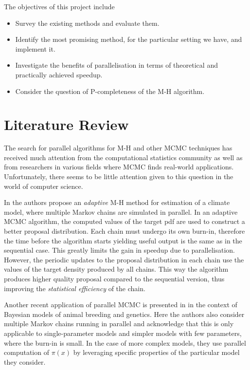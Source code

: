 \documentclass[11pt]{article}       %
\begin{document}
The objectives of this project include
\begin{itemize}
\item Survey the existing methods and evaluate them.
\item Identify the most promising method, for the particular setting we have, and implement it.
\item Investigate the benefits of parallelisation in terms of theoretical and
     practically achieved speedup.
\item Consider the question of P-completeness of the M-H algorithm.
\end{itemize}


\section{Literature Review} \label{litrev}

The search for parallel algorithms for M-H and other MCMC techniques has received
much attention from the computational statistics community as well as from 
researchers in various fields where MCMC finds real-world applications.  
Unfortunately, there seems to be little attention given to this question 
in the world of computer science.

In \cite{solonen2012efficient} the authors propose an \emph{adaptive} M-H
method for estimation of a climate model, where multiple Markov chains are
simulated in parallel.  In an adaptive MCMC algorithm, the computed values of
the target pdf are used to construct a better proposal distribution.  Each
chain must undergo its own burn-in, therefore the time before the algorithm
starts yielding useful output is the same as in the sequential case.  This
greatly limits the gain in speedup due to parallelisation.  However, the
periodic updates to the proposal distribution in each chain use the values of
the target density produced by all chains.  This way the algorithm produces
higher quality proposal compared to the sequential version, thus improving the
\emph{statistical efficiency} of the chain.

Another recent application of parallel MCMC is presented in
\cite{wu2012parallel} in the context of Bayesian models of animal breeding and
genetics.  Here the authors also consider multiple Markov chains running in
parallel and acknowledge that this is only applicable to single-parameter
models and simpler models with few parameters, where the burn-in is small.  In
the case of more complex models, they use parallel computation of $\pi(x)$ by
leveraging specific properties of the particular model they consider.
\end{document}
